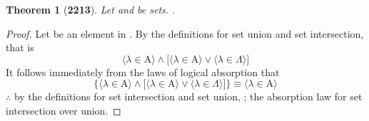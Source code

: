 \documentclass[preview]{standalone}
\newtheorem*{theorem*}{Theorem}
\begin{document}
\begin{theorem*}[\textbf{2213}] \color{black}
    Let  and \bm{$\Lambda$} be sets. 
    .
\end{theorem*}
\begin{proof} \color{black}
    Let \bm{$\lambda$} be an element in 
    . 
    By the definitions for set union and set intersection, that is 
    \begin{equation*}
        \Big \langle \lambda \in \mathrm{A} \Big \rangle 
            \land 
        \bigg[
            \Big \langle \lambda \in \mathrm{A} \Big \rangle 
                \lor 
            \Big \langle \lambda \in \Lambda \Big \rangle
        \bigg]
    \end{equation*}
    It follows immediately from the laws of logical absorption that
    \begin{equation*}
        \Bigg\{
            \Big \langle \lambda \in \mathrm{A} \Big \rangle 
                \land 
            \bigg[
                \Big \langle \lambda \in \mathrm{A} \Big \rangle 
                    \lor 
                \Big \langle \lambda \in \Lambda \Big \rangle
            \bigg]
        \Bigg\}
            \equiv
        \bigg \langle \lambda \in \mathrm{A} \bigg \rangle 
    \end{equation*}
    $\therefore$ by the definitions for set intersection and set union, 
    ; 
    the absorption law for set intersection over union. 
\color{lightgray} \end{proof}
\end{document}
